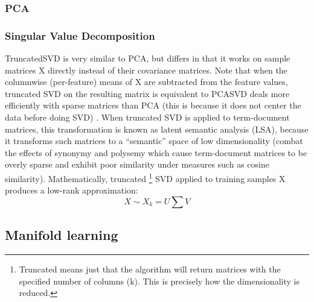 \documentclass[11pt]{article}
\begin{document}
\subsubsection{PCA}
\subsubsection{Singular Value Decomposition}
TruncatedSVD is very similar to PCA, but differs in that it works on sample matrices X directly instead of their covariance matrices. Note that when the columnwise (per-feature) means of X are subtracted from the feature values, truncated SVD on the resulting matrix is equivalent to PCASVD deals more efficiently with sparse matrices than PCA (this is because it does not center the data before doing SVD) \cite{halko2009finding}. When truncated SVD is applied to term-document matrices, this transformation is known as latent semantic analysis (LSA), because it transforms such matrices to a “semantic” space of low dimensionality (combat the effects of synonymy and polysemy which cause term-document matrices to be overly sparse and exhibit poor similarity under measures such as cosine similarity).
Mathematically, truncated \footnote{Truncated means just that the algorithm will return matrices with the specified number of columns (k). This is precisely how the dimensionality is reduced.} SVD applied to training samples X produces a low-rank approximation:
\begin{equation}
X \sim X_k = U \sum V
\end{equation}



\subsection{Manifold learning}
\end{document}
